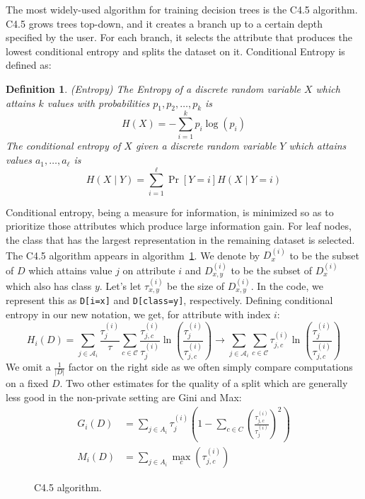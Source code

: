\documentclass[11pt]{report}
\newtheorem{defn}{Definition}
\renewcommand{\t}[1]{\texttt{#1}}
\begin{document}
The most widely-used algorithm for training decision trees is the C4.5 algorithm. C4.5 grows trees top-down, and it creates a branch up to a certain depth specified by the user. For each branch, it selects the attribute that produces the lowest conditional entropy and splits the dataset on it. Conditional Entropy is defined as:
\begin{defn}
(Entropy) The Entropy of a discrete random variable $X$ which attains $k$ values with probabilities $p_1, p_2, \ldots, p_k$ is
\[
H(X) = -\sum_{i=1}^k p_i \log(p_i)
\]
The conditional entropy of $X$ given a discrete random variable $Y$ which attains values $a_1, \ldots, a_\ell$ is
\[
H(X\mid Y) = \sum_{i=1}^\ell \Pr[Y=i] H(X\mid Y=i)
\]
\end{defn}
Conditional entropy, being a measure for information, is minimized so as to prioritize those attributes which produce large information gain. For leaf nodes, the class that has the largest representation in the remaining dataset is selected. The C4.5 algorithm appears in algorithm~\ref{alg:c45}.
We denote by $D^{(i)}_{x}$ to be the subset of $D$ which attains value $j$ on attribute $i$ and $D^{(i)}_{x,y}$ to be the subset of $D^{(i)}_{x}$ which also has class $y$. Let's let $\tau^{(i)}_{x,y}$ be the size of $D^{(i)}_{x,y}$. In the code, we represent this as \t{D[i=x]} and \t{D[class=y]}, respectively. Defining conditional entropy in our new notation, we get, for attribute with index $i$:
\begin{equation}\label{eq:cond_ent}
H_i(D) = 
\sum_{j\in \mathcal{A}_i} \frac{\tau^{(i)}_{j}}{\tau}\sum_{c \in \mathcal{C}} \frac{\tau^{(i)}_{j,c}}{\tau^{(i)}_{j}}\ln\left(\frac{\tau^{(i)}_{j}}{\tau^{(i)}_{j,c}}\right) \rightarrow \sum_{j\in \mathcal{A}_i}\sum_{c \in \mathcal{C}} {\tau^{(i)}_{j,c}}\ln\left(\frac{\tau^{(i)}_{j}}{\tau^{(i)}_{j,c}}\right)
\end{equation}
We omit a $\frac{1}{|D|}$ factor on the right side as we often simply compare computations on a fixed $D$. Two other estimates for the quality of a split which are generally less good in the non-private setting are Gini and Max:
\begin{align}
G_i(D) &= \sum_{j \in A_i} \tau^{(i)}_j\left(1-\sum_{c \in C}\left(\frac{\tau^{(i)}_{j,c}}{\tau^{(i)}_{j}}\right)^2\right)\label{eq:gini} \\
M_i(D) &= \sum_{j \in A_i} \max_c(\tau^{(i)}_{j,c})
\label{eq:max}
\end{align}
\begin{figure}


\caption{C4.5 algorithm.}\label{alg:c45}
\end{figure}
\end{document}
